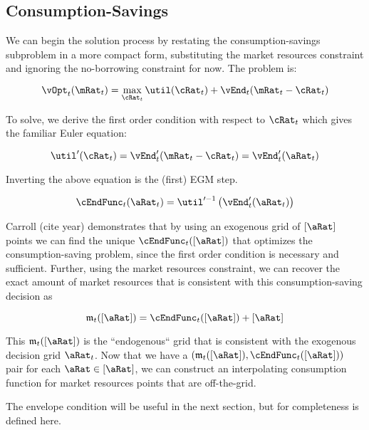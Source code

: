\documentclass[\econtexRoot/EGMN]{subfiles}
\begin{document}
\subsection{Consumption-Savings}

We can begin the solution process by restating the consumption-savings subproblem in a more compact form, substituting the market resources constraint and ignoring the no-borrowing constraint for now. The problem is:

\begin{equation}
    \vOpt_{t}(\mRat_{t}) = \max_{\cRat_{t}} \util(\cRat_{t}) +
    \vEnd_{t}(\mRat_{t}-\cRat_{t})
\end{equation}

To solve, we derive the first order condition with respect to $\cRat_{t}$ which gives the familiar Euler equation:

\begin{equation}
    \util'(\cRat_t) = \vEnd_{t}'(\mRat_{t} - \cRat_{t}) =
    \vEnd_{t}'(\aRat_{t})
\end{equation}

Inverting the above equation is the (first) EGM step.

\begin{equation}
    \cEndFunc_{t}(\aRat_{t}) = \util'^{-1}\left( \vEnd_{t}'(\aRat_{t})
    \right)
\end{equation}

Carroll (cite year) demonstrates that by using an exogenous grid of $[\aRat]$ points we can find the unique
$\cEndFunc_{t}([\aRat])$ that optimizes the consumption-saving problem, since the first order condition is necessary and sufficient.
Further, using the market resources constraint, we can recover the exact amount
of market resources that is consistent with this consumption-saving decision as

\providecommand{\mEndFunc}{\ensuremath{\mathfrak{m}}}

\begin{equation}
    \mEndFunc_{t}([\aRat]) = \cEndFunc_{t}([\aRat]) + [\aRat]
\end{equation}

This $\mEndFunc_{t}([\aRat])$ is the ``endogenous`` grid that is consistent
with the exogenous decision grid $\aRat_{t}$. Now that we have a
$(\mEndFunc_{t}([\aRat]), \cEndFunc_{t}([\aRat]))$ pair for each
$\aRat \in [\aRat]$, we can construct an interpolating consumption function for
market resources points that are off-the-grid.

The envelope condition will be useful in the next section, but for completeness
is defined here.
\end{document}
